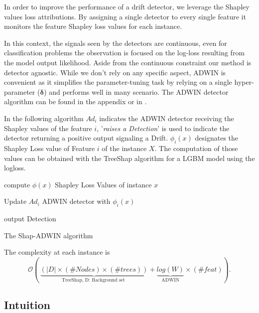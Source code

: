 \documentclass[runningheads]{llncs}
\begin{document}
In order to improve the performance of a drift detector, we leverage the Shapley values loss attributions. 
By assigning a single detector to every single feature it monitors the feature Shapley loss values for each instance.

In this context, the signals seen by the detectors are continuous, even for classification problems the observation is focused on the log-loss resulting from the model output likelihood.
Aside from the continuous constraint our method is detector agnostic. While we don't rely on any specific aspect, ADWIN is convenient as it simplifies the parameter-tuning task by relying on a single hyper-parameter ($\mathbf{\delta}$) and performs well in many scenario. The ADWIN detector algorithm can be found in the appendix or in \cite{bifet_learning_2007}. %

In the following algorithm $Ad_i$ indicates the ADWIN detector receiving the Shapley values of the feature $i$, '\textit{raises a Detection}' is used to indicate the detector returning a positive output signaling a Drift. 
$\phi_i(x)$ designates the Shapley Loss value of Feature $i$ of the instance $X$. The computation of those values can be obtained with the TreeShap algorithm for a LGBM model using the logloss.

\begin{algorithm}[htbp]
        \DontPrintSemicolon
         {
            compute $\phi(x)$ Shapley Loss Values of instance $x$
             {
                Update $Ad_i$ ADWIN detector with $\phi_i(x)$ 
                
                 {
                    output Detection}
            }
        }
        \caption{The Shap-ADWIN algorithm}
        \label{alg:shap-ADWIN}
    \end{algorithm}
    
The complexity at each instance is
\begin{equation}
     \mathcal{O}(\,
    \underbrace{(|D|\times(\#Nodes)\times(\# trees))}_\text{TreeShap, D: Background set } + 
    \underbrace{log(W)}_{\text{ADWIN}}
    \times(\#feat)).
\end{equation}

    

\subsection{Intuition}%
\end{document}
